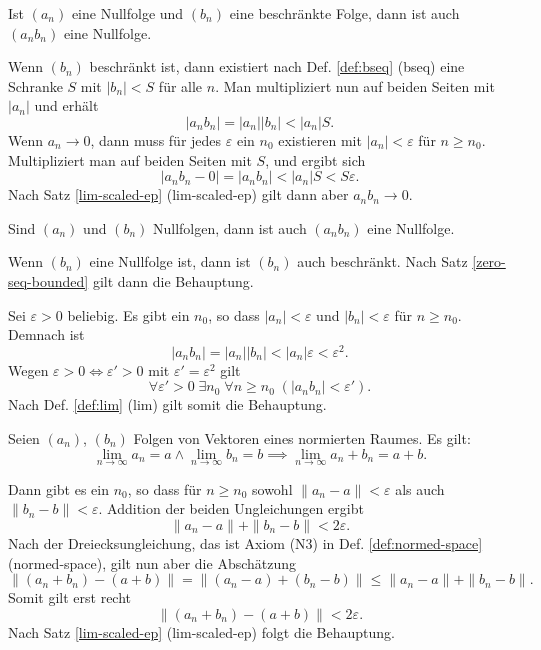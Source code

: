 \begin{Satz}\label{zero-seq-bounded}
Ist $(a_n)$ eine Nullfolge und $(b_n)$ eine beschränkte Folge,
dann ist auch $(a_n b_n)$ eine Nullfolge.
\end{Satz}

\begin{Beweis}
Wenn $(b_n)$ beschränkt ist, dann existiert nach
Def. \ref{def:bseq} (bseq) eine Schranke $S$ mit
$|b_n|<S$ für alle $n$. Man multipliziert nun auf beiden Seiten
mit $|a_n|$ und erhält
\[|a_n b_n| = |a_n| |b_n| < |a_n| S.\]
Wenn $a_n\to 0$, dann muss für jedes $\varepsilon$
ein $n_0$ existieren mit $|a_n|<\varepsilon$ für $n\ge n_0$.
Multipliziert man auf beiden Seiten mit $S$, und ergibt sich
\[|a_n b_n-0| = |a_n b_n| < |a_n| S < S\varepsilon.\]
Nach Satz \ref{lim-scaled-ep} (lim-scaled-ep) gilt dann
aber $a_n b_n\to 0$.\,\qedsymbol
\end{Beweis}

\begin{Satz}
Sind $(a_n)$ und $(b_n)$ Nullfolgen,
dann ist auch $(a_n b_n)$ eine Nullfolge.
\end{Satz}

\begin{Beweis}[Beweis 1]
Wenn $(b_n)$ eine Nullfolge ist, dann ist $(b_n)$ auch beschränkt.
Nach Satz \ref{zero-seq-bounded} gilt dann die Behauptung.
\end{Beweis}

\begin{Beweis}[Beweis 2]
Sei $\varepsilon>0$ beliebig.
Es gibt ein $n_0$, so dass
$|a_n|<\varepsilon$ und $|b_n|<\varepsilon$ für $n\ge n_0$.
Demnach ist
\[|a_n b_n| = |a_n| |b_n|< |a_n|\varepsilon <\varepsilon^2.\]
Wegen $\varepsilon>0\iff\varepsilon'>0$ mit
$\varepsilon'=\varepsilon^2$ gilt
\[\forall\varepsilon'{>}0\;\exists n_0\;\forall n{\ge}n_0\;
(|a_n b_n|<\varepsilon').\]
Nach Def. \ref{def:lim} (lim) gilt somit die Behauptung.\,\qedsymbol
\end{Beweis}

\newpage
\begin{Satz}%
\label{lim-add}
Seien $(a_n)$, $(b_n)$ Folgen von Vektoren eines normierten Raumes.
Es gilt:
\[\lim_{n\to\infty} a_n = a\land \lim_{n\to\infty} b_n
= b \implies \lim_{n\to\infty} a_n+b_n = a+b.\]
\end{Satz}

\begin{Beweis}
Dann gibt es ein $n_0$, so dass für $n\ge n_0$ sowohl
$\|a_n-a\|<\varepsilon$ als auch $\|b_n-b\|<\varepsilon$.
Addition der beiden Ungleichungen ergibt
\[\|a_n-a\| + \|b_n-b\| < 2\varepsilon.\]
Nach der Dreiecksungleichung, das ist Axiom (N3) in Def.
\ref{def:normed-space} (normed-space), gilt nun aber die Abschätzung
\[\|(a_n+b_n)-(a+b)\| = \|(a_n-a)+(b_n-b)\| \le \|a_n-a\|+\|b_n-b\|.\]
Somit gilt erst recht
\[\|(a_n+b_n)-(a+b)\| < 2\varepsilon.\]
Nach Satz \ref{lim-scaled-ep} (lim-scaled-ep)
folgt die Behauptung.\,\qedsymbol
\end{Beweis}

